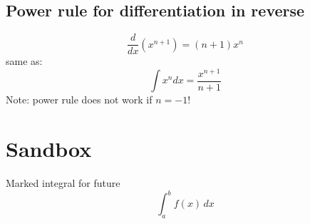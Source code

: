 \documentclass{article}
\begin{document}
\subsection{Power rule for differentiation in reverse}
\begin{equation}
  \frac{d}{dx}(x^{n+1}) = (n+1)x^n
\end{equation}
same as:
\begin{equation}
  \int x^ndx = \frac{x^{n+1}}{n+1}
\end{equation}
Note: power rule does not work if $n=-1$!

\section{Sandbox}
Marked integral for future
\begin{equation}
  \int_{a}^{b} f(x) \, dx
\end{equation}
\end{document}
